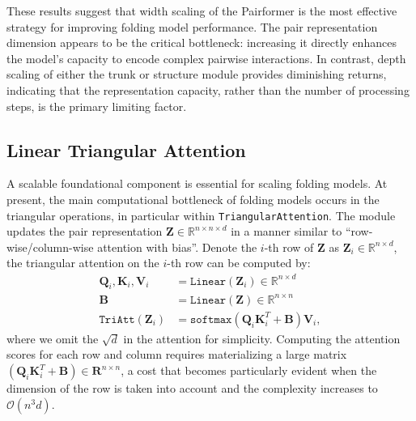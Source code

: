 These results suggest that width scaling of the Pairformer is the most effective strategy for improving folding model performance. The pair representation dimension appears to be the critical bottleneck: increasing it directly enhances the model's capacity to encode complex pairwise interactions. In contrast, depth scaling of either the trunk or structure module provides diminishing returns, indicating that the representation capacity, rather than the number of processing steps, is the primary limiting factor.















\subsection{Linear Triangular Attention}
\label{sec:linear_att}

A scalable foundational component is essential for scaling folding models. At present, the main computational bottleneck of folding models occurs in the triangular operations, in particular within \texttt{TriangularAttention}. The module updates the pair representation $\mathbf{Z} \in \mathbb{R}^{n\times n \times d}$ in a manner similar to ``row-wise/column-wise attention with bias''. Denote the $i$-th row of $\mathbf{Z}$ as $\mathbf{Z}_i \in \mathbb{R}^{n\times d}$, the triangular attention on the $i$-th row can be computed by:
\begin{align}
\mathbf{Q}_i, \mathbf{K}_i, \mathbf{V}_i & = \mathtt{Linear}(\mathbf{Z}_i) \in \mathbb{R}^{n\times d} \\
\mathbf{B} & = \mathtt{Linear}(\mathbf{Z}) \in \mathbb{R}^{n\times n} \\
\mathtt{TriAtt}(\mathbf{Z}_i) & = \mathtt{softmax}\left(\mathbf{Q}_i\mathbf{K}_i^T+\mathbf{B}\right)\mathbf{V}_i,
\end{align}
where we omit the $\sqrt{d}$ in the attention for simplicity. Computing the attention scores for each row and column requires materializing a large matrix $(\mathbf{Q}_i\mathbf{K}_i^T+\mathbf{B}) \in \mathbf{R}^{n\times n}$, a cost that becomes particularly evident when the dimension of the row is taken into account and the complexity increases to  $\mathcal{O}(n^3d)$. 




